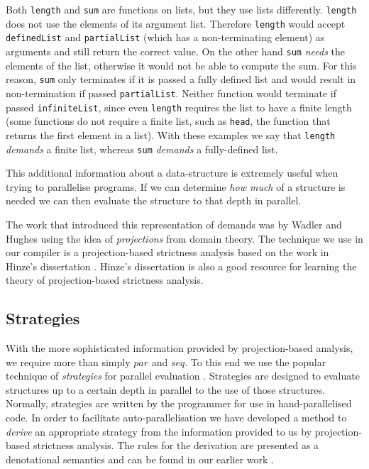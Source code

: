 Both \verb-length- and \verb-sum- are functions on lists, but they use lists
differently. \verb-length- does not use the elements of its argument list.
Therefore \verb-length- would accept \verb-definedList- and \verb-partialList-
(which has a non-terminating element) as arguments and still return the correct
value. On the other hand \verb-sum- \emph{needs} the elements of the list,
otherwise it would not be able to compute the sum. For this reason, \verb-sum-
only terminates if it is passed a fully defined list and would result in
non-termination if passed \verb-partialList-. Neither function would terminate
if passed \verb-infiniteList-, since even \verb-length- requires the list to
have a finite length (some functions do not require a finite list, such as
\verb-head-, the function that returns the first element in a list). With
these examples we say that \verb-length- \emph{demands} a finite list, whereas
\verb-sum- \emph{demands} a fully-defined list.

This additional information about a data-structure is extremely useful when
trying to parallelise programs. If we can determine \emph{how much} of a
structure is needed we can then evaluate the structure to that depth in
parallel.


The work that introduced this representation of demands was by Wadler and
Hughes \citep{wadler1987projections} using the idea of \emph{projections} from
domain theory.  The technique we use in our compiler is a projection-based
strictness analysis based on the work in Hinze's dissertation
\citep{hinze1995projection}.  Hinze's dissertation is also a good resource for
learning the theory of projection-based strictness analysis.


\subsection*{Strategies}

With the more sophisticated information provided by projection-based analysis,
we require more than simply $par$ and $seq$. To this end we use the popular
technique of \emph{strategies} for parallel evaluation \citep{strategies,
marlow2010seq}. Strategies are designed to evaluate structures up to a certain
depth in parallel to the use of those structures. Normally, strategies are
written by the programmer for use in hand-parallelised code. In order to
facilitate auto-parallelisation we have developed a method to \emph{derive} an
appropriate strategy from the information provided to us by projection-based
strictness analysis. The rules for the derivation are presented as a
denotational semantics and can be found in our earlier work \citep{calderon}.


